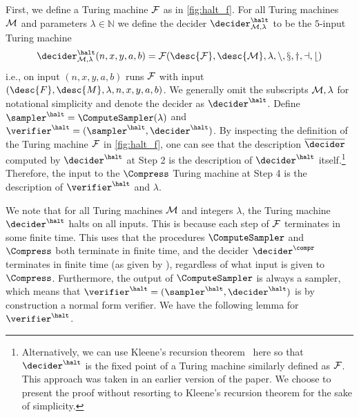 First, we define a Turing machine $\cal{F}$ as in \cref{fig:halt_f}.
For all Turing machines $\cal{M}$ and parameters $\lambda\in\mathbb{N}$ we define the decider
$\decider^\halt_{\cal{M}, \lambda}$ to be the $5$-input Turing machine 
\[
\decider^\halt_{\cal{M}, \lambda}(n,x,y,a,b) = \cal{F}(\desc{F}, \desc{M},
\lambda, n, x, y, a, b)
\]
i.e., on
input $(n, x, y, a, b)$ runs $\cal{F}$ with input $(\desc{F}, \desc{M},
\lambda, n, x, y, a, b)$.
We generally omit the subscripts $\cal{M}, \lambda$ for notational simplicity
and denote the decider as $\decider^\halt$.
Define $\sampler^\halt = \ComputeSampler(\lambda)$ and $\verifier^\halt =
(\sampler^\halt, \decider^\halt)$.
By inspecting the definition of the Turing machine $\cal{F}$ in \cref{fig:halt_f},
one can see that the description $\overline{\decider}$ computed by
$\decider^\halt$ at Step 2 is the description of $\decider^\halt$
itself.\footnote{Alternatively, we can use Kleene's recursion
  theorem~\cite{Kleene1954} here so that $\decider^\halt$ is the fixed point of
  a Turing machine similarly defined as $\cal{F}$.
  This approach was taken in an earlier version of the paper.
  We choose to present the proof without resorting to Kleene's recursion theorem
  for the sake of simplicity.}
Therefore, the input to the $\Compress$ Turing machine at Step 4 is the description of
$\verifier^\halt$ and $\lambda$.

 We note that for all Turing machines $\cal{M}$ and integers $\lambda$, the Turing 
machine $\decider^\halt$ halts on all inputs. This is because each step of $\cal{F}$ terminates in some finite time. This 
uses that the procedures $\ComputeSampler$ and $\Compress$ both terminate in finite time, and the decider
$\decider^\compr$ terminates in finite time (as given by ), regardless of what input is given
to $\Compress$.  Furthermore, the output of $\ComputeSampler$ is always a sampler, which means that $\verifier^\halt = (\sampler^\halt,\decider^\halt)$ is by construction a normal form verifier. We have the following lemma for $\verifier^\halt$.










